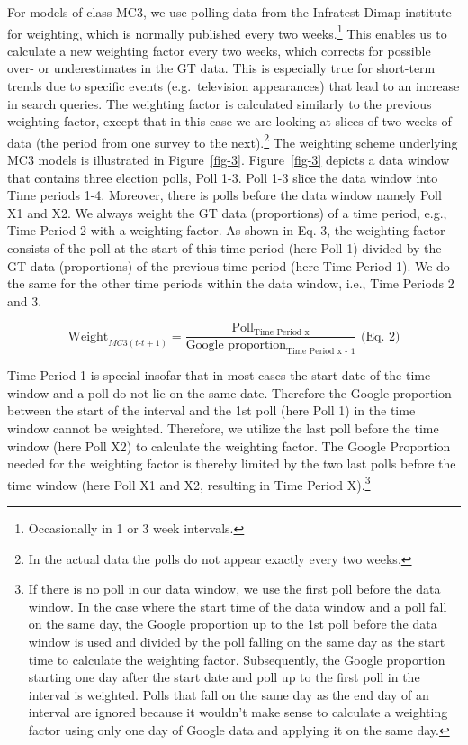 \documentclass[
  letterpaper,
  DIV=11,
  numbers=noendperiod]{scrartcl}
\begin{document}
For models of class MC3, we use polling data from the Infratest Dimap
institute for weighting, which is normally published every two
weeks.\footnote{Occasionally in 1 or 3 week intervals.} This enables us
to calculate a new weighting factor every two weeks, which corrects for
possible over- or underestimates in the GT data. This is especially true
for short-term trends due to specific events (e.g.~television
appearances) that lead to an increase in search queries. The weighting
factor is calculated similarly to the previous weighting factor, except
that in this case we are looking at slices of two weeks of data (the
period from one survey to the next).\footnote{In the actual data the
  polls do not appear exactly every two weeks.} The weighting scheme
underlying MC3 models is illustrated in Figure~\ref{fig-3}.
Figure~\ref{fig-3} depicts a data window that contains three election
polls, Poll 1-3. Poll 1-3 slice the data window into Time periods 1-4.
Moreover, there is polls before the data window namely Poll X1 and X2.
We always weight the GT data (proportions) of a time period, e.g., Time
Period 2 with a weighting factor. As shown in Eq. 3, the weighting
factor consists of the poll at the start of this time period (here Poll
1) divided by the GT data (proportions) of the previous time period
(here Time Period 1). We do the same for the other time periods within
the data window, i.e., Time Periods 2 and 3.

\[\text{Weight}_{MC3(t ‐ t+1)}=\frac{\text{Poll}_{\text{Time Period x}}}{\text{Google proportion}_{\text{Time Period x - 1}}}\text{ (Eq. 2)}\]

Time Period 1 is special insofar that in most cases the start date of
the time window and a poll do not lie on the same date. Therefore the
Google proportion between the start of the interval and the 1st poll
(here Poll 1) in the time window cannot be weighted. Therefore, we
utilize the last poll before the time window (here Poll X2) to calculate
the weighting factor. The Google Proportion needed for the weighting
factor is thereby limited by the two last polls before the time window
(here Poll X1 and X2, resulting in Time Period X).\footnote{If there is
  no poll in our data window, we use the first poll before the data
  window. In the case where the start time of the data window and a poll
  fall on the same day, the Google proportion up to the 1st poll before
  the data window is used and divided by the poll falling on the same
  day as the start time to calculate the weighting factor. Subsequently,
  the Google proportion starting one day after the start date and poll
  up to the first poll in the interval is weighted. Polls that fall on
  the same day as the end day of an interval are ignored because it
  wouldn't make sense to calculate a weighting factor using only one day
  of Google data and applying it on the same day.}
\end{document}

